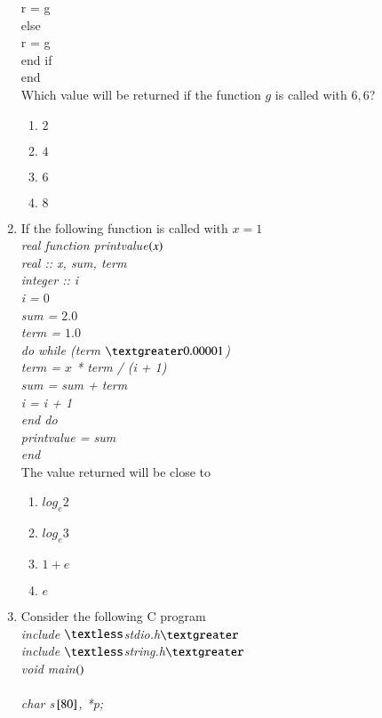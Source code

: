\documentclass[journal]{IEEEtran}
\begin{document}
\begin{enumerate}
{{        r = g\\
    else\\
        r = g\\
    end if\\
end\\}
Which value will be returned if the function $g$ is called with $6,6$?
\begin{enumerate}
\item $2$
\item $4$
\item $6$
\item $8$
\end{enumerate}
}
\item{
If the following function is called with $x=1$\\
\textit{
real function print\textunderscore value$\left(x\right)$\\
    real :: x, sum, term\\
    integer :: i\\
    i = $0$\\
    sum = $2.0$\\
    term = $1.0$\\
    do while (term $\textgreater 0.00001$)\\
        term = $x$ * term / (i + 1)\\
        sum = sum + term\\
        i = i + 1\\
    end do\\
    print\textunderscore value = sum\\
end\\
}
The value returned will be close to
\begin{multicols}{4}
\begin{enumerate}
\item $log_e2$
\item $log_e3$
\item $1+e$
\item $e$
\end{enumerate}
\end{multicols}
}
\item{
Consider the following C program\\
\textit{
include $\textless$stdio.h$\textgreater$\\
include $\textless$string.h$\textgreater$\\
void main$\left(\right)$\\
{\\
    char s${}\left[80\right]$, *p;\\
}}}
\end{enumerate}
\end{document}
